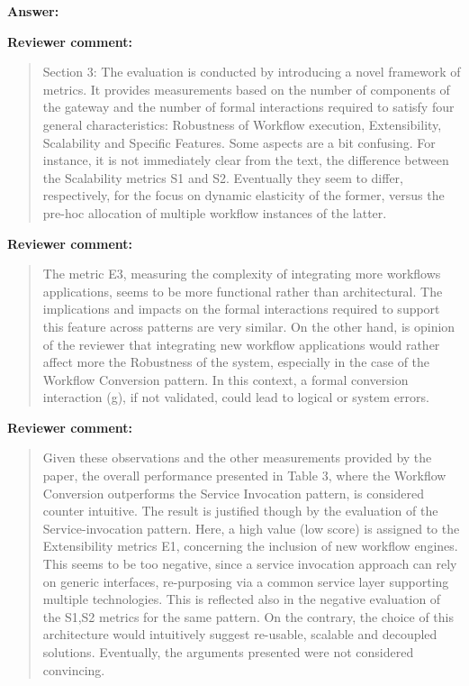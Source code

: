 \documentclass[a4]{letter}
\newenvironment{review}%
{\textbf{Reviewer comment:}\begin{quote}}%
{\end{quote}}%
\newcommand{\answer}[1]{\textbf{Answer:} #1}
\begin{document}
\begin{letter}{}
\answer{}

\begin{review}
Section 3:
The evaluation is conducted by introducing a novel framework of metrics. It provides measurements based on the number of components of the gateway and the number of formal interactions required to satisfy four general characteristics: Robustness of Workflow execution, Extensibility, Scalability and Specific Features. Some aspects are a bit confusing. For instance, it is not immediately clear from the text, the difference between the Scalability metrics S1 and S2. Eventually they seem to differ, respectively, for the focus on dynamic elasticity of the former, versus the pre-hoc allocation of multiple workflow instances of the latter.
\end{review}

\begin{review}
The metric E3, measuring the complexity of integrating more workflows applications, seems to be more functional rather than architectural. The implications and impacts on the formal interactions required to support this feature across patterns are very similar. On the other hand, is opinion of the reviewer that integrating new workflow applications would rather affect more the Robustness of the system, especially in the case of the Workflow Conversion pattern. In this context, a formal conversion interaction (g), if not validated, could lead to logical or system errors.
\end{review}

\begin{review}
 Given these observations and the other measurements provided by the paper, the overall performance presented in Table 3, where the Workflow Conversion outperforms the Service Invocation pattern, is considered counter intuitive. The result is justified though by the evaluation of the Service-invocation pattern. Here, a high value (low score) is assigned to the Extensibility metrics E1, concerning the inclusion
of new workflow engines. This seems to be too negative, since a service invocation approach can rely on generic interfaces, re-purposing via a common service layer supporting multiple technologies. This is reflected also in the negative evaluation of the S1,S2 metrics for the same pattern. On the contrary, the choice of this architecture would intuitively suggest re-usable, scalable and decoupled solutions. Eventually, the arguments presented were not considered convincing.
\end{review}


\end{letter}
\end{document}
